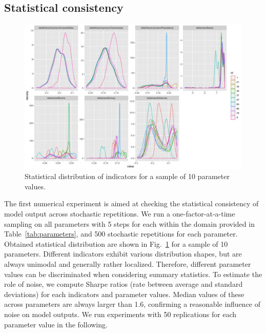 \documentclass[referee,lineno,pdflatex,sn-apa]{sn-jnl}
\begin{document}
\subsection{Statistical consistency}


\begin{figure}[h]
	\includegraphics[width=\linewidth]{figures/Fig2.jpg}
	\caption{Statistical distribution of indicators for a sample of 10 parameter values.\label{fig:fig2}}
\end{figure}


The first numerical experiment is aimed at checking the statistical consistency of model output across stochastic repetitions. We run a one-factor-at-a-time sampling on all parameters with 5 steps for each within the domain provided in Table~\ref{tab:parameters}, and 500 stochastic repetitions for each parameter. Obtained statistical distribution are shown in Fig.~\ref{fig:fig2} for a sample of 10 parameters. Different indicators exhibit various distribution shapes, but are always unimodal and generally rather localized. Therefore, different parameter values can be discriminated when considering summary statistics. To estimate the role of noise, we compute Sharpe ratios (rate between average and standard deviations) for each indicators and parameter values. Median values of these across parameters are always larger than 1.6, confirming a reasonable influence of noise on model outputs. We run experiments with 50 replications for each parameter value in the following.
\end{document}
